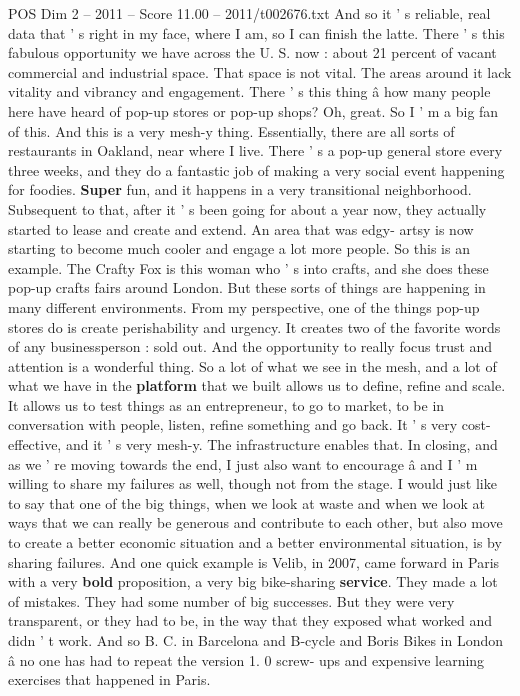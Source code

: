 \begin{textsample}{POS Dim 2 – 2011 – Score 11.00 – 2011/t002676.txt}
And so it ' s reliable, real data that ' s right in my face, where I am, so I can finish the latte.
There ' s this fabulous opportunity we have across the U.
S. now : about 21 percent of vacant commercial and industrial space.
That space is not vital.
The areas around it lack vitality and vibrancy and engagement.
There ' s this thing â how many people here have heard of pop-up stores or pop-up shops?
Oh, great.
So I ' m a big fan of this.
And this is a very mesh-y thing.
Essentially, there are all sorts of restaurants in Oakland, near where I live.
There ' s a pop-up general store every three weeks, and they do a fantastic job of making a very social event happening for foodies. \textbf{Super} fun, and it happens in a very transitional neighborhood.
Subsequent to that, after it ' s been going for about a year now, they actually started to lease and create and extend.
An area that was edgy- artsy is now starting to become much cooler and engage a lot more people.
So this is an example.
The Crafty Fox is this woman who ' s into crafts, and she does these pop-up crafts fairs around London.
But these sorts of things are happening in many different environments.
From my perspective, one of the things pop-up stores do is create perishability and urgency.
It creates two of the favorite words of any businessperson : sold out.
And the opportunity to really focus trust and attention is a wonderful thing.
So a lot of what we see in the mesh, and a lot of what we have in the \textbf{platform} that we built allows us to define, refine and scale.
It allows us to test things as an entrepreneur, to go to market, to be in conversation with people, listen, refine something and go back.
It ' s very cost-effective, and it ' s very mesh-y.
The infrastructure enables that.
In closing, and as we ' re moving towards the end, I just also want to encourage â and I ' m willing to share my failures as well, though not from the stage.
I would just like to say that one of the big things, when we look at waste and when we look at ways that we can really be generous and contribute to each other, but also move to create a better economic situation and a better environmental situation, is by sharing failures.
And one quick example is Velib, in 2007, came forward in Paris with a very \textbf{bold} proposition, a very big bike-sharing \textbf{service}.
They made a lot of mistakes.
They had some number of big successes.
But they were very transparent, or they had to be, in the way that they exposed what worked and didn ' t work.
And so B.
C. in Barcelona and B-cycle and Boris Bikes in London â no one has had to repeat the version 1. 0 screw- ups and expensive learning exercises that happened in Paris.

\end{textsample}
